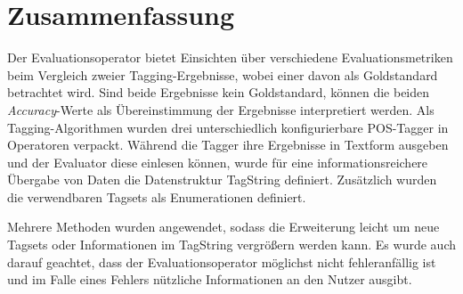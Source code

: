 \section{Zusammenfassung}
\label{sec:system:conclusion}

Der Evaluationsoperator bietet Einsichten über verschiedene Evaluationsmetriken beim Vergleich zweier Tagging-Ergebnisse, wobei einer davon als Goldstandard betrachtet wird. Sind beide Ergebnisse kein Goldstandard, können die beiden \textit{Accuracy}-Werte als Übereinstimmung der Ergebnisse interpretiert werden. Als Tagging-Algorithmen wurden drei unterschiedlich konfigurierbare POS-Tagger in Operatoren verpackt. Während die Tagger ihre Ergebnisse in Textform ausgeben und der Evaluator diese einlesen können, wurde für eine informationsreichere Übergabe von Daten die Datenstruktur TagString definiert. Zusätzlich wurden die verwendbaren Tagsets als Enumerationen definiert.

Mehrere Methoden wurden angewendet, sodass die Erweiterung leicht um neue Tagsets oder Informationen im TagString vergrößern werden kann. Es wurde auch darauf geachtet, dass der Evaluationsoperator möglichst nicht fehleranfällig ist und im Falle eines Fehlers nützliche Informationen an den Nutzer ausgibt.